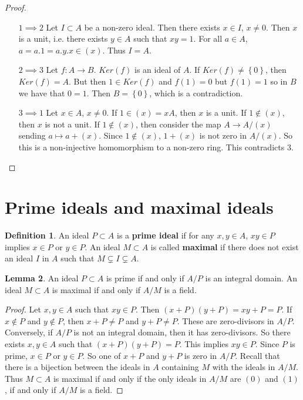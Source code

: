 \documentclass{article}
\newcommand{\rb}[1]{\left( #1 \right)}
\newcommand{\cb}[1]{\left\{ #1 \right\}}
\theoremstyle{definition}\newtheorem{definition}{Definition}[section]
\theoremstyle{definition}\newtheorem{remark}[definition]{Remark}
\theoremstyle{definition}\newtheorem*{example}{Example}
\theoremstyle{definition}\newtheorem*{note}{Note}
\newtheorem{lemma}[definition]{Lemma}
\begin{document}
\begin{proof}
\hfill
\begin{enumerate}[leftmargin=2cm]
\item[$ 1 \implies 2 $] Let $ I \subset A $ be a non-zero ideal. Then there exists $ x \in I $, $ x \ne 0 $. Then $ x $ is a unit, i.e. there exists $ y \in A $ such that $ xy = 1 $. For all $ a \in A $, $ a = a.1 = a.y.x \in \rb{x} $. Thus $ I = A $.
\item[$ 2 \implies 3 $] Let $ f : A \to B $. $ Ker\rb{f} $ is an ideal of $ A $. If $ Ker\rb{f} \ne \cb{0} $, then $ Ker\rb{f} = A $. But then $ 1 \in Ker\rb{f} $ and $ f\rb{1} = 0 $ but $ f\rb{1} = 1 $ so in $ B $ we have that $ 0 = 1 $. Then $ B = \cb{0} $, which is a contradiction.
\item[$ 3 \implies 1 $] Let $ x \in A $, $ x \ne 0 $. If $ 1 \in \rb{x} = xA $, then $ x $ is a unit. If $ 1 \notin \rb{x} $, then $ x $ is not a unit. If $ 1 \notin \rb{x} $, then consider the map $ A \to A / \rb{x} $ sending $ a \mapsto a + \rb{x} $. Since $ 1 \notin \rb{x} $, $ 1 + \rb{x} $ is not zero in $ A / \rb{x} $. So this is a non-injective homomorphism to a non-zero ring. This contradicts $ 3 $.
\end{enumerate}
\end{proof}

\section{Prime ideals and maximal ideals}

\begin{definition}
An ideal $ P \subset A $ is a \textbf{prime ideal} if for any $ x, y \in A $, $ xy \in P $ implies $ x \in P $ or $ y \in P $. An ideal $ M \subset A $ is called \textbf{maximal} if there does not exist an ideal $ I $ in $ A $ such that $ M \subsetneq I \subsetneq A $.
\end{definition}

\begin{lemma}
An ideal $ P \subset A $ is prime if and only if $ A / P $ is an integral domain. An ideal $ M \subset A $ is maximal if and only if $ A / M $ is a field.
\end{lemma}

\begin{proof}
Let $ x, y \in A $ such that $ xy \in P $. Then $ \rb{x + P}\rb{y + P} = xy + P = P $. If $ x \notin P $ and $ y \notin P $, then $ x + P \ne P $ and $ y + P \ne P $. These are zero-divisors in $ A / P $. Conversely, if $ A / P $ is not an integral domain, then it has zero-divisors. So there exists $ x, y \in A $ such that $ \rb{x + P}\rb{y + P} = P $. This implies $ xy \in P $. Since $ P $ is prime, $ x \in P $ or $ y \in P $. So one of $ x + P $ and $ y + P $ is zero in $ A / P $. Recall that there is a bijection between the ideals in $ A $ containing $ M $ with the ideals in $ A / M $. Thus $ M \subset A $ is maximal if and only if the only ideals in $ A / M $ are $ \rb{0} $ and $ \rb{1} $, if and only if $ A / M $ is a field.
\end{proof}
\end{document}
